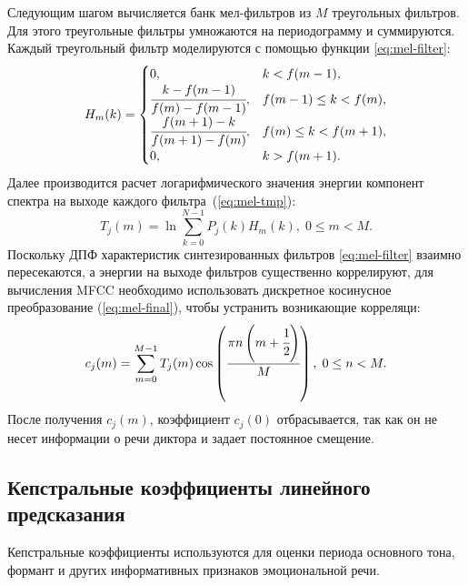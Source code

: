 Следующим шагом вычисляется банк мел-фильтров из $M$ треугольных фильтров. Для этого треугольные фильтры умножаются на периодограмму и суммируются. Каждый треугольный фильтр моделируются с помощью функции \ref{eq:mel-filter}:
\begin{equation}\label{eq:mel-filter}
	H_m(k) = \begin{cases}
				0, & k < f(m - 1), \\
				\cfrac{k - f(m - 1)}{f(m) - f(m - 1)}, & f(m - 1) \leq k < f(m),\\
				\cfrac{f(m + 1) - k}{f(m + 1) - f(m)}, & f(m) \leq k < f(m + 1),\\
				0, & k > f(m + 1).\\
			\end{cases}
\end{equation}
Далее производится расчет логарифмического значения энергии компонент спектра на выходе каждого фильтра~(\ref{eq:mel-tmp}):
\begin{equation}\label{eq:mel-tmp}
	T_j(m) = \ln \sum_{k = 0}^{N - 1}P_j(k)H_m(k),\;0 \leq m < M.
\end{equation}
Поскольку ДПФ характеристик синтезированных фильтров \ref{eq:mel-filter} взаимно пересекаются, а энергии на выходе фильтров существенно коррелируют, для вычисления MFCC необходимо использовать дискретное косинусное преобразование (\ref{eq:mel-final}), чтобы устранить возникающие корреляци:
\begin{equation}\label{eq:mel-final}
	c_j(m) = \sum_{m=0}^{M-1}T_j(m)\cos\left(\cfrac{\pi n\left(m + \cfrac{1}{2}\right)}{M}\right),\;0 \leq n < M.
\end{equation}
После получения $c_j(m)$, коэффициент $c_j(0)$ отбрасывается, так как он не несет информации о речи диктора
и задает постоянное смещение.~\cite{frames}
\subsection{Кепстральные коэффициенты линейного предсказания}
Кепстральные коэффициенты используются для оценки периода основного тона, формант и других информативных признаков эмоциональной речи. 

